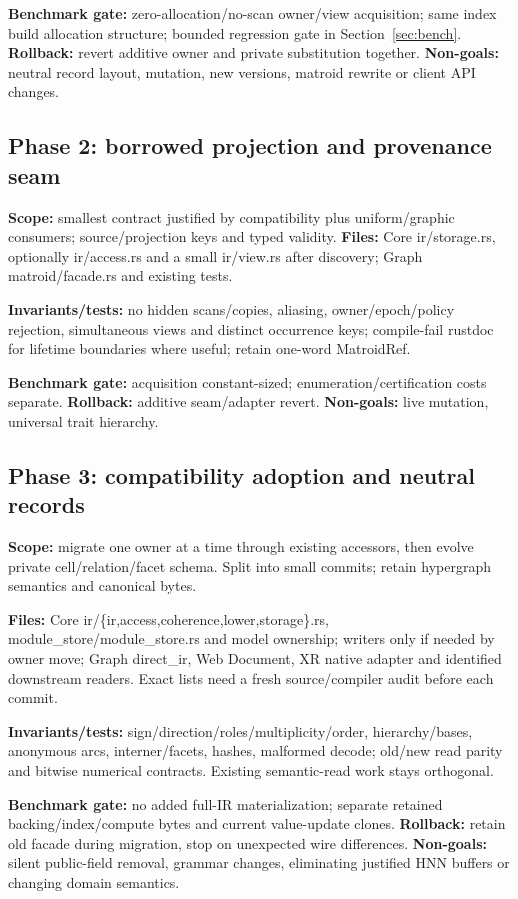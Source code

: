 \documentclass[10pt,a4paper]{article}
\begin{document}
\textbf{Benchmark gate:} zero-allocation/no-scan owner/view acquisition; same index build allocation structure; bounded regression gate in Section~\ref{sec:bench}. \textbf{Rollback:} revert additive owner and private substitution together. \textbf{Non-goals:} neutral record layout, mutation, new versions, matroid rewrite or client API changes.

\subsection{Phase 2: borrowed projection and provenance seam}
\textbf{Scope:} smallest contract justified by compatibility plus uniform/graphic consumers; source/projection keys and typed validity. \textbf{Files:} Core ir/storage.rs, optionally ir/access.rs and a small ir/view.rs after discovery; Graph matroid/facade.rs and existing tests.

\textbf{Invariants/tests:} no hidden scans/copies, aliasing, owner/epoch/policy rejection, simultaneous views and distinct occurrence keys; compile-fail rustdoc for lifetime boundaries where useful; retain one-word MatroidRef.

\textbf{Benchmark gate:} acquisition constant-sized; enumeration/certification costs separate. \textbf{Rollback:} additive seam/adapter revert. \textbf{Non-goals:} live mutation, universal trait hierarchy.

\subsection{Phase 3: compatibility adoption and neutral records}
\textbf{Scope:} migrate one owner at a time through existing accessors, then evolve private cell/relation/facet schema. Split into small commits; retain hypergraph semantics and canonical bytes.

\textbf{Files:} Core ir/\{ir,access,coherence,lower,storage\}.rs, module\_store/module\_store.rs and model ownership; writers only if needed by owner move; Graph direct\_ir, Web Document, XR native adapter and identified downstream readers. Exact lists need a fresh source/compiler audit before each commit.

\textbf{Invariants/tests:} sign/direction/roles/multiplicity/order, hierarchy/bases, anonymous arcs, interner/facets, hashes, malformed decode; old/new read parity and bitwise numerical contracts. Existing semantic-read work stays orthogonal.

\textbf{Benchmark gate:} no added full-IR materialization; separate retained backing/index/compute bytes and current value-update clones. \textbf{Rollback:} retain old facade during migration, stop on unexpected wire differences. \textbf{Non-goals:} silent public-field removal, grammar changes, eliminating justified HNN buffers or changing domain semantics.
\end{document}
